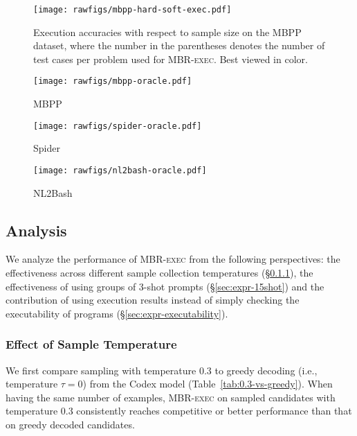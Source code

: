 \documentclass[11pt]{article}
\newcommand{\mbrexec}{\textsc{MBR-exec}\xspace}
\begin{document}
\begin{figure}[t]
\end{figure} \begin{figure}
    \centering
    \texttt{[image: rawfigs/mbpp-hard-soft-exec.pdf]}
    \caption{Execution accuracies with respect to sample size on the MBPP dataset, where the number in the parentheses denotes the number of test cases per problem used for \mbrexec. Best viewed in color.}
    \label{fig:mbpp-hard-soft-exec}
\end{figure} \begin{figure*}[t]
    \centering
    \begin{subfigure}[t]{0.34\textwidth}
        \texttt{[image: rawfigs/mbpp-oracle.pdf]}
        \caption{MBPP}
    \end{subfigure}
    \hspace{-10pt}
    \begin{subfigure}[t]{0.34\textwidth}
        \texttt{[image: rawfigs/spider-oracle.pdf]}
        \caption{Spider}
    \end{subfigure}
    \hspace{-10pt}
    \begin{subfigure}[t]{0.34\textwidth}
        \texttt{[image: rawfigs/nl2bash-oracle.pdf]}
        \caption{NL2Bash}
    \end{subfigure}
    \caption{Sample size--oracle performance curves on the considered datasets. We calculate each expected Pass@K with 5 different sets of candidates for each sample size, while using the same sets to perform \mbrexec for fair comparison. }
    \label{fig:oracle}
\end{figure*} \subsection{Analysis}
\label{sec:expr-analysis}
We analyze the performance of \mbrexec from the following perspectives: the effectiveness across different sample collection temperatures (\S\ref{sec:expr-temperature}), the effectiveness of using groups of 3-shot prompts (\S\ref{sec:expr-15shot}) and the contribution of using execution results instead of simply checking the executability of programs (\S\ref{sec:expr-executability}).

\subsubsection{Effect of Sample Temperature}
\label{sec:expr-temperature}
We first compare sampling with temperature 0.3 to greedy decoding (i.e., temperature $\tau=0$) from the Codex model (Table~\ref{tab:0.3-vs-greedy}). When having the same number of examples, \mbrexec on sampled candidates with temperature 0.3 consistently reaches competitive or better performance than that on greedy decoded candidates. 
\end{document}
